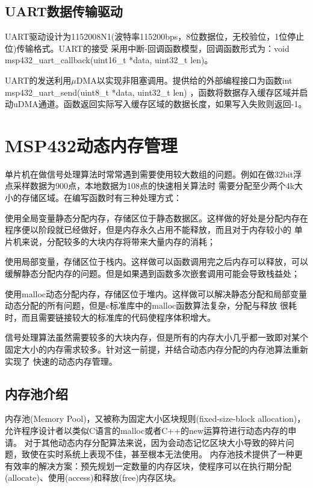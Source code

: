 \subsection{UART数据传输驱动}
	UART驱动设计为1152008N1(波特率115200bps，8位数据位，无校验位，1位停止位)传输格式。UART的接受
采用中断-回调函数模型，回调函数形式为：void msp432\_uart\_callback(uint16\_t *data, uint32\_t len)。

	UART的发送利用$\mu$DMA以实现非阻塞调用。提供给的外部编程接口为函数int msp432\_uart\_send(uint8\_t *data, uint32\_t len)
，函数将数据存入缓存区域并启动uDMA通道。函数返回实际写入缓存区域的数据长度，如果写入失败则返回-1。 

\section{MSP432动态内存管理}


	单片机在做信号处理算法时常常遇到需要使用较大数组的问题。例如在做32bit浮点采样数据为900点，本地数据为108点的快速相关算法时
需要分配至少两个4k大小的存储区域。在编写函数时有三种处理方式：

\begin{publist}
	\item 使用全局变量静态分配内存，存储区位于静态数据区。这样做的好处是分配内存在程序便以阶段就已经做好，但是内存永久占用不能释放，而且对于内存较小的
	单片机来说，分配较多的大块内存将带来大量内存的消耗；
	\item 使用局部变量，存储区位于栈内。这样做可以函数调用完之后内存可以释放，可以缓解静态分配内存的问题。但是如果遇到函数多次嵌套调用可能会导致栈益处；
	\item 使用malloc动态分配内存，存储区位于堆内。这样做可以解决静态分配和局部变量动态分配的所有问题，但是c标准库中的malloc函数算法复杂，分配与释放
	很耗时，而且需要链接较大的标准库的代码使程序体积增大。
\end{publist}

	信号处理算法虽然需要较多的大块内存，但是所有的内存大小几乎都一致即对某个固定大小的内存需求较多。针对这一前提，并结合动态内存分配的内存池算法重新实现了
快速的动态内存管理。


\subsection{内存池介绍}
	内存池(Memory Pool)，又被称为固定大小区块规则(fixed-size-block allocation)，允许程序设计者以类似C语言的malloc或者C++的new运算符进行动态内存的申请。
对于其他动态内存分配算法来说，因为会动态记忆区块大小导致的碎片问题，致使在实时系统上表现不佳，甚至根本无法使用。
内存池技术提供了一种更有效率的解决方案：预先规划一定数量的内存区块，使程序可以在执行期分配(allocate)、使用(access)和释放(free)内存区块。
	
